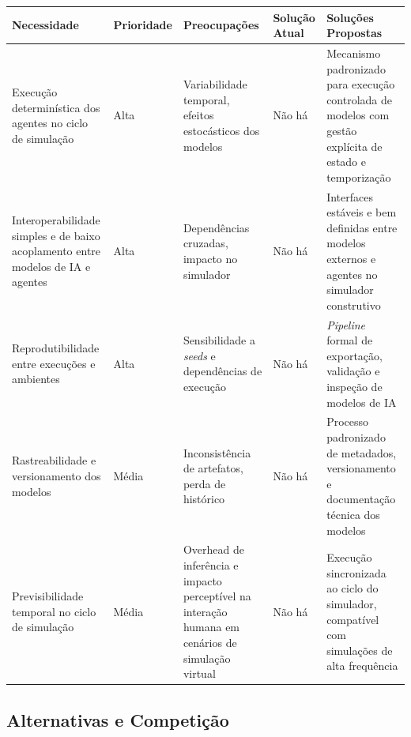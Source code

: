 \begin{table}[h]
    \begin{tabular}{| p{} | p{} | p{} | p{} | p{} |}
        \hline
        \textbf{Necessidade} & \textbf{Prioridade} & \textbf{Preocupações} & \textbf{Solução Atual} & \textbf{Soluções Propostas} \\ \hline
        
        Execução determinística dos agentes no ciclo de simulação &
        Alta &
        Variabilidade temporal, efeitos estocásticos dos modelos &
        Não há &
        Mecanismo padronizado para execução controlada de modelos com gestão explícita de estado e temporização \\ \hline
        
        Interoperabilidade simples e de baixo acoplamento entre modelos de IA e agentes &
        Alta &
        Dependências cruzadas, impacto no simulador &
        Não há &
        Interfaces estáveis e bem definidas entre modelos externos e agentes no simulador construtivo \\ \hline
        
        Reprodutibilidade entre execuções e ambientes &
        Alta &
        Sensibilidade a \emph{seeds} e dependências de execução &
        Não há &
        \emph{Pipeline} formal de exportação, validação e inspeção de modelos de IA \\ \hline
        
        Rastreabilidade e versionamento dos modelos &
        Média &
        Inconsistência de artefatos, perda de histórico &
        Não há &
        Processo padronizado de metadados, versionamento e documentação técnica dos modelos \\ \hline

        Previsibilidade temporal no ciclo de simulação &
        Média &
        Overhead de inferência e impacto perceptível na interação humana em cenários de simulação virtual &
        Não há &
        Execução sincronizada ao ciclo do simulador, compatível com simulações de alta frequência \\ \hline
        
    \end{tabular}
\end{table}

\subsection{Alternativas e Competição}

